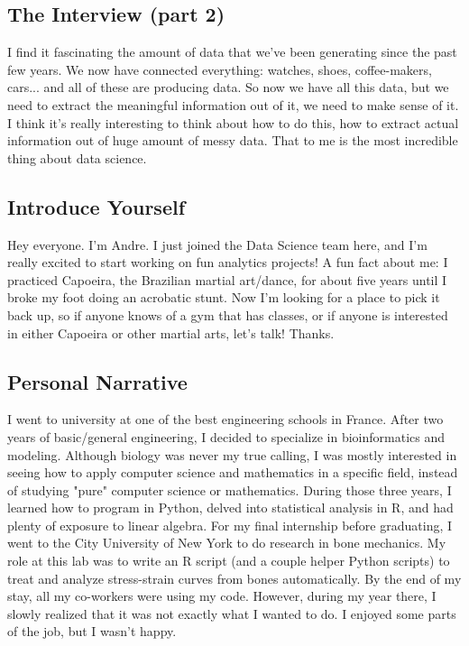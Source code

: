 \documentclass[]{article}
\begin{document}
\subsection*{The Interview (part 2)}
I find it fascinating the amount of data that we've been generating since the past few years. We now have connected everything: watches, shoes, coffee-makers, cars... and all of these are producing data. So now we have all this data, but we need to extract the meaningful information out of it, we need to make sense of it. I think it's really interesting to think about how to do this, how to extract actual information out of huge amount of messy data. That to me is the most incredible thing about data science.

\subsection*{Introduce Yourself}
Hey everyone. I'm Andre. I just joined the Data Science team here, and I'm really excited to start working on fun analytics projects! A fun fact about me: I practiced Capoeira, the Brazilian martial art/dance, for about five years until I broke my foot doing an acrobatic stunt. Now I'm looking for a place to pick it back up, so if anyone knows of a gym that has classes, or if anyone is interested in either Capoeira or other martial arts, let's talk! Thanks.

\newpage
\subsection*{Personal Narrative}
I went to university at one of the best engineering schools in France. After two years of basic/general engineering, I decided to specialize in bioinformatics and modeling. Although biology was never my true calling, I was mostly interested in seeing how to apply computer science and mathematics in a specific field, instead of studying "pure" computer science or mathematics. During those three years, I learned how to program in Python, delved into statistical analysis in R, and had plenty of exposure to linear algebra. For my final internship before graduating, I went to the City University of New York to do research in bone mechanics. My role at this lab was to write an R script (and a couple helper Python scripts) to treat and analyze stress-strain curves from bones automatically. By the end of my stay, all my co-workers were using my code. However, during my year there, I slowly realized that it was not exactly what I wanted to do. I enjoyed some parts of the job, but I wasn't happy.
\end{document}
